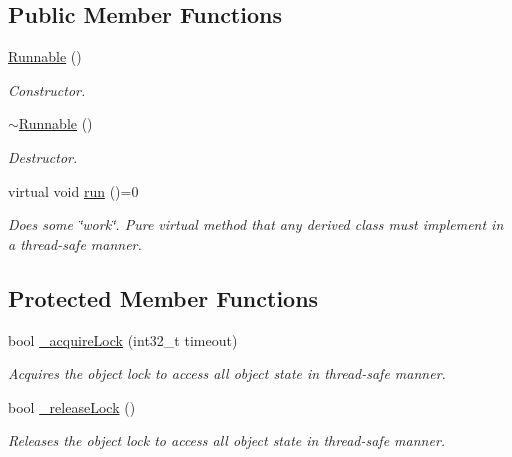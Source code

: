 \subsection*{Public Member Functions}
\begin{DoxyCompactItemize}
\item 
\hypertarget{classxmem_1_1thread_1_1_runnable_a19af0a2e2b8f986c51196b9c4b2340fb}{}\hyperlink{classxmem_1_1thread_1_1_runnable_a19af0a2e2b8f986c51196b9c4b2340fb}{Runnable} ()\label{classxmem_1_1thread_1_1_runnable_a19af0a2e2b8f986c51196b9c4b2340fb}

\begin{DoxyCompactList}\small\item\em Constructor. \end{DoxyCompactList}\item 
\hypertarget{classxmem_1_1thread_1_1_runnable_a3bf7483afb8d40ec8dbec57efb64f0c2}{}\hyperlink{classxmem_1_1thread_1_1_runnable_a3bf7483afb8d40ec8dbec57efb64f0c2}{$\sim$\+Runnable} ()\label{classxmem_1_1thread_1_1_runnable_a3bf7483afb8d40ec8dbec57efb64f0c2}

\begin{DoxyCompactList}\small\item\em Destructor. \end{DoxyCompactList}\item 
\hypertarget{classxmem_1_1thread_1_1_runnable_af2915224b03db20403550291672733a7}{}virtual void \hyperlink{classxmem_1_1thread_1_1_runnable_af2915224b03db20403550291672733a7}{run} ()=0\label{classxmem_1_1thread_1_1_runnable_af2915224b03db20403550291672733a7}

\begin{DoxyCompactList}\small\item\em Does some \char`\"{}work\char`\"{}. Pure virtual method that any derived class must implement in a thread-\/safe manner. \end{DoxyCompactList}\end{DoxyCompactItemize}
\subsection*{Protected Member Functions}
\begin{DoxyCompactItemize}
\item 
bool \hyperlink{classxmem_1_1thread_1_1_runnable_ad2a24a9e69f4592ceb1356d28d45f784}{\+\_\+acquire\+Lock} (int32\+\_\+t timeout)
\begin{DoxyCompactList}\small\item\em Acquires the object lock to access all object state in thread-\/safe manner. \end{DoxyCompactList}\item 
bool \hyperlink{classxmem_1_1thread_1_1_runnable_aacef5cf385638157e24e7a33d0a4e450}{\+\_\+release\+Lock} ()
\begin{DoxyCompactList}\small\item\em Releases the object lock to access all object state in thread-\/safe manner. \end{DoxyCompactList}\end{DoxyCompactItemize}


